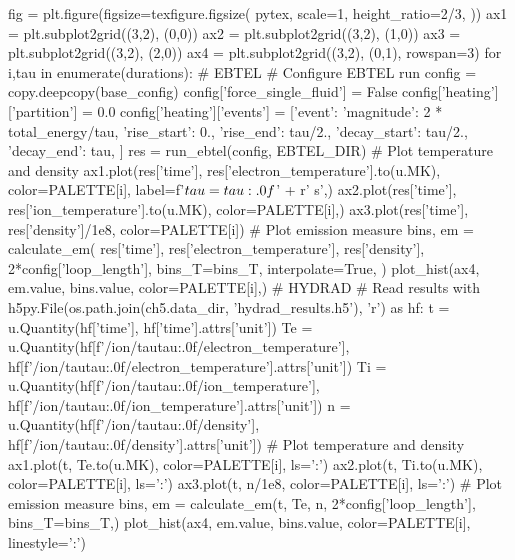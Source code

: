\begin{pycode}[chapter5]
fig = plt.figure(figsize=texfigure.figsize(
    pytex,
    scale=1,
    height_ratio=2/3,
))
ax1 = plt.subplot2grid((3,2), (0,0))
ax2 = plt.subplot2grid((3,2), (1,0))
ax3 = plt.subplot2grid((3,2), (2,0))
ax4 = plt.subplot2grid((3,2), (0,1), rowspan=3)
for i,tau in enumerate(durations):
    # EBTEL
    # Configure EBTEL run
    config = copy.deepcopy(base_config)
    config['force_single_fluid'] = False
    config['heating']['partition'] = 0.0
    config['heating']['events'] = [{'event': {
        'magnitude': 2 * total_energy/tau,
        'rise_start': 0.,
        'rise_end': tau/2.,
        'decay_start': tau/2.,
        'decay_end': tau,
    }}]
    res = run_ebtel(config, EBTEL_DIR)
    # Plot temperature and density
    ax1.plot(res['time'], res['electron_temperature'].to(u.MK), color=PALETTE[i],
                label=f'$\\tau={tau:.0f}$' + r' \si{\second}',)
    ax2.plot(res['time'], res['ion_temperature'].to(u.MK), color=PALETTE[i],)
    ax3.plot(res['time'], res['density']/1e8, color=PALETTE[i])
    # Plot emission measure
    bins, em = calculate_em(
        res['time'],
        res['electron_temperature'],
        res['density'],
        2*config['loop_length'],
        bins_T=bins_T,
        interpolate=True,
    )
    plot_hist(ax4, em.value, bins.value, color=PALETTE[i],)
    # HYDRAD
    # Read results
    with h5py.File(os.path.join(ch5.data_dir, 'hydrad_results.h5'), 'r') as hf:
        t = u.Quantity(hf['time'], hf['time'].attrs['unit'])
        Te = u.Quantity(hf[f'/ion/tau{tau:.0f}/electron_temperature'],
                        hf[f'/ion/tau{tau:.0f}/electron_temperature'].attrs['unit'])
        Ti = u.Quantity(hf[f'/ion/tau{tau:.0f}/ion_temperature'],
                        hf[f'/ion/tau{tau:.0f}/ion_temperature'].attrs['unit'])
        n = u.Quantity(hf[f'/ion/tau{tau:.0f}/density'],
                       hf[f'/ion/tau{tau:.0f}/density'].attrs['unit'])
    # Plot temperature and density
    ax1.plot(t, Te.to(u.MK), color=PALETTE[i], ls=':')
    ax2.plot(t, Ti.to(u.MK), color=PALETTE[i], ls=':')
    ax3.plot(t, n/1e8, color=PALETTE[i], ls=':')
    # Plot emission measure
    bins, em = calculate_em(t, Te, n, 2*config['loop_length'], bins_T=bins_T,)
    plot_hist(ax4, em.value, bins.value, color=PALETTE[i], linestyle=':')
    

\end{pycode}
